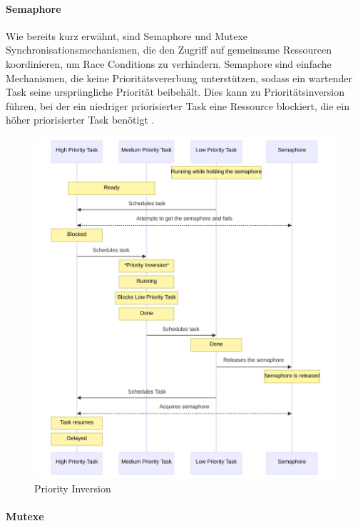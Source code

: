 \paragraph{Semaphore}

Wie bereits kurz erwähnt, sind Semaphore und Mutexe Synchronisationsmechanismen,
die den Zugriff auf gemeinsame Ressourcen koordinieren, um Race Conditions zu
verhindern. Semaphore sind einfache Mechanismen, die keine Prioritätsvererbung
unterstützen, sodass ein wartender Task seine ursprüngliche Priorität beibehält.
Dies kann zu Prioritätsinversion führen, bei der ein niedriger priorisierter
Task eine Ressource blockiert, die ein höher priorisierter Task benötigt
\cite{wikipedia_priority_inversion}.

\begin{figure}[htb]
    \centering
    \includegraphics[width=1\textwidth]{assets/prio_inversion}
    \caption{Priority Inversion}
\end{figure}

\paragraph{Mutexe}

